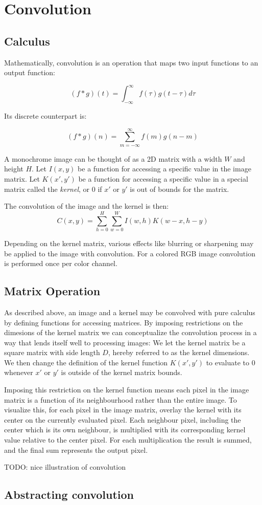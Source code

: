 \section{Convolution}
\subsection{Calculus}
Mathematically, convolution is an operation that maps two input functions to an output function:

\[
    (f * g)(t) = \int^{\infty}_{-\infty}{f(\tau)g(t-\tau) d\tau}
\]

Its discrete counterpart is:

\[
    (f * g)(n) = \sum^{\infty}_{m=-\infty}{f(m)g(n-m)}
\]

A monochrome image can be thought of as a 2D matrix with a width $W$ and height $H$.
Let $I(x, y)$ be a function for accessing a specific value in the image matrix.
Let $K(x', y')$ be a function for accessing a specific value in a special matrix called the \textit{kernel},
or $0$ if $x'$ or $y'$ is out of bounds for the matrix.

The convolution of the image and the kernel is then:
\[
    C(x, y) = \sum^{H}_{h=0} \sum^{W}_{w=0}{I(w, h)K(w - x, h -y)}
\]

Depending on the kernel matrix,
various effects like blurring or sharpening may be applied to the image with convolution.
For a colored RGB image convolution is performed once per color channel.

\subsection{Matrix Operation}
As described above, an image and a kernel may be convolved with pure calculus by defining functions for accessing matrices.
By imposing restrictions on the dimesions of the kernel matrix we can conceptualize the convolution process in a way that lends itself well to processing images:
We let the kernel matrix be a square matrix with side length $D$, hereby referred to as the kernel dimensions.
We then change the definition of the kernel function $K(x', y')$ to evaluate to $0$ whenever $x'$ or $y'$ is outside of the kernel matrix bounds.

Imposing this restriction on the kernel function means each pixel in the image matrix is a function of its neighbourhood rather than the entire image.
To visualize this, for each pixel in the image matrix, overlay the kernel with its center on the currently evaluated pixel.
Each neighbour pixel, including the center which is its own neighbour, is multiplied with its corresponding kernel value relative to the center pixel.
For each multiplication the result is summed, and the final sum represents the output pixel. 

TODO: nice illustration of convolution

\subsection{Abstracting convolution}


